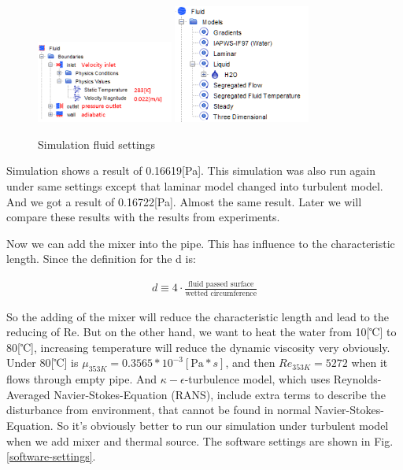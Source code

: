 \documentclass[journal,article,processes,submit,moreauthors,pdftex]{Definitions/mdpi}
\begin{document}
\begin{figure}
\begin{center}
\centerline{\includegraphics[width=0.4\textwidth]{./docu_pictures/fluid.png} \includegraphics[width=0.4\textwidth]{./docu_pictures/fluid2.png}}
\end{center}
\caption{Simulation fluid settings}
\label{fluid-settings}
\end{figure}

Simulation shows a result of 0.16619[Pa]. This simulation was also run again under same settings except that laminar model changed into turbulent model. And we got a result of 0.16722[Pa]. Almost the same result. Later we will compare these results with the results from experiments. 

Now we can add the mixer into the pipe. This has influence to the characteristic length. Since the definition for the d is:

\begin{align*}
    d \equiv 4 \cdot \frac{\text{fluid passed surface}}{\text{wetted circumference}}
\end{align*}

So the adding of the mixer will reduce the characteristic length and lead to the reducing of Re. But on the other hand, we want to heat the water from 10[℃] to 80[℃], increasing temperature will reduce the dynamic viscosity very obviously. Under 80[℃] is  $\mu_{353K}=0.3565*10^{-3}[\text{Pa}*s]$, and then $Re_{353K}=5272$ when it flows through empty pipe. And $\kappa-\epsilon$-turbulence model, which uses Reynolds-Averaged Navier-Stokes-Equation (RANS), include extra terms to describe the disturbance from environment, that cannot be found in normal Navier-Stokes-Equation. So it's obviously better to run our simulation under turbulent model when we add mixer and thermal source. The software settings are shown in Fig. \ref{software-settings}.
\end{document}
